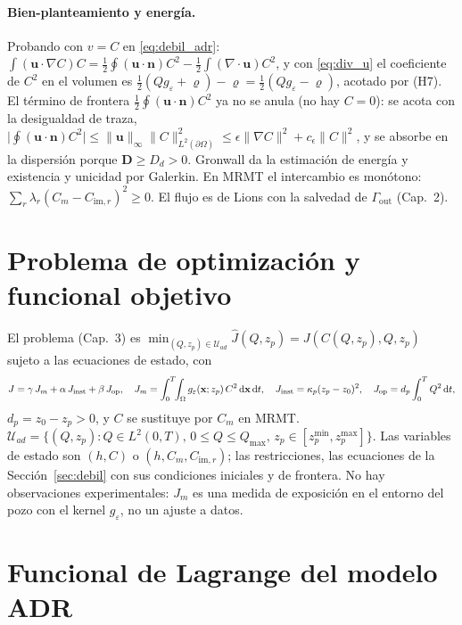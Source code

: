 \documentclass[11pt]{article}
\numberwithin{equation}{section}
\theoremstyle{remark}
\newcommand{\bu}{\mathbf{u}}
\newcommand{\bD}{\mathbf{D}}
\newcommand{\bn}{\mathbf{n}}
\newcommand{\bx}{\mathbf{x}}
\newcommand{\geps}{g_\varepsilon}
\newcommand{\im}{\mathrm{im}}
\newcommand{\vr}{\varrho}              %
\newcommand{\dd}{\,\mathrm{d}}
\newcommand{\Gout}{\Gamma_{\mathrm{out}}}
\begin{document}
\paragraph{Bien-planteamiento y energ\'ia.} Probando con $v=C$ en \eqref{eq:debil_adr}: $\int(\bu\cdot\nabla C)C=\tfrac12\oint(\bu\cdot\bn)C^2-\tfrac12\int(\nabla\!\cdot\bu)C^2$, y
con \eqref{eq:div_u} el coeficiente de $C^2$ en el volumen es $\tfrac12(Q\geps+\vr)-\vr=\tfrac12(Q\geps-\vr)$, acotado por (H7). El t\'ermino de frontera
$\tfrac12\oint(\bu\cdot\bn)C^2$ ya no se anula (no hay $C=0$): se acota con la desigualdad de traza, $\bigl|\oint(\bu\cdot\bn)C^2\bigr|\le\|\bu\|_\infty\|C\|^2_{L^2(\partial\Omega)}\le\epsilon\|\nabla C\|^2+c_\epsilon\|C\|^2$,
y se absorbe en la dispersi\'on porque $\bD\ge D_d>0$. Gronwall da la estimaci\'on de energ\'ia y existencia y unicidad por Galerkin. En MRMT el intercambio es monótono: $\sum_r\lambda_r(C_m-C_{\im,r})^2\ge0$. El
flujo es de Lions con la salvedad de $\Gout$ (Cap.~2).

\section{Problema de optimizaci\'on y funcional objetivo}
\label{sec:opt}

El problema (Cap.~3) es $\min_{(Q,z_p)\in\mathcal{U}_{ad}}\hat J(Q,z_p)=J(C(Q,z_p),Q,z_p)$ sujeto a las ecuaciones de estado, con
\[
J=\gamma\,J_m+\alpha\,J_{\rm inst}+\beta\,J_{\rm op},\quad
J_m=\int_0^T\!\!\int_\Omega\geps(\bx;z_p)\,C^2\dd\bx\dd t,\quad J_{\rm inst}=\kappa_p(z_p-z_0)^2,\quad J_{\rm op}=d_p\int_0^TQ^2\dd t,
\]
$d_p=z_0-z_p>0$, y $C$ se sustituye por $C_m$ en MRMT. $\mathcal{U}_{ad}=\{(Q,z_p):Q\in L^2(0,T),\,0\le Q\le Q_{\max},\,z_p\in[z_p^{\min},z_p^{\max}]\}$.
Las variables de estado son $(h,C)$ o $(h,C_m,C_{\im,r})$; las restricciones, las ecuaciones de la Secci\'on~\ref{sec:debil} con sus condiciones iniciales y de frontera.
No hay observaciones experimentales: $J_m$ es una medida de exposici\'on en el entorno del pozo con el kernel $\geps$, no un ajuste a datos.

\section{Funcional de Lagrange del modelo ADR}
\label{sec:L_ADR}
\end{document}
